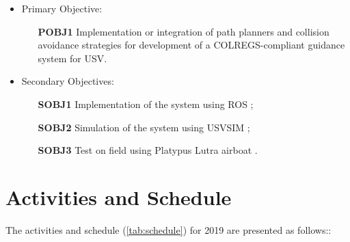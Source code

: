         \begin{center}
        \begin{itemize}
            \item Primary Objective:
                \begin{itemize}
                    \item [\textbf{POBJ1}] Implementation or integration of path planners and collision avoidance strategies for development of a \ac{COLREGS}-compliant guidance system for \ac{USV}.
                \end{itemize}
            \item Secondary Objectives:
                \begin{itemize}
                    \item [\textbf{SOBJ1}] Implementation of the system using \acf{ROS} \cite{Quigley2009ROS};
                    \item [\textbf{SOBJ2}] Simulation of the system using USVSIM \cite{Paravisi2018Toward};
                    \item [\textbf{SOBJ3}] Test on field using Platypus Lutra airboat \cite{PlatypusLutraAirboat}.
                \end{itemize}
        \end{itemize}
        \end{center}

    \section{Activities and Schedule}
    \label{subsec:activities_and_schedule}
        The activities and schedule (\ref{tab:schedule}) for 2019 are presented as follows::
        
